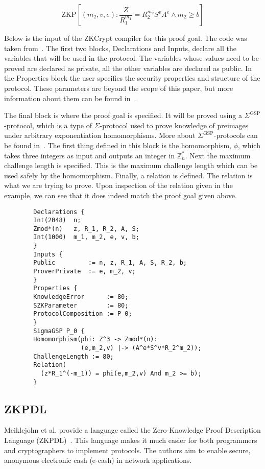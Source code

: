 \documentclass{sig-alternate}
\begin{document}
		\begin{equation*}
		\text{ZKP}[(m_{2}, v, e): \frac{Z}{R^{m_{1}}_{1}} = R^{m_{2}}_{2}S^{v}A^{e} \land m_{2} \ge b]
		\end{equation*}
		
		Below is the input of the ZKCrypt compiler for this proof goal. The code was taken
		from~\cite{ZKCrypt:2012}. The first two blocks, Declarations and Inputs, declare 
		all the variables that will be used in the protocol. The variables whose values
		need to be proved are declared as private, all the other variables are declared as
		public. In the Properties block the user specifies the security properties and
		structure of the protocol. These parameters are beyond the scope of this paper, but
		more information about them can be found in~\cite{ZKCrypt:2012}. 
		
		The final block is 	where the proof goal is specified. It will be proved using a
		$\Sigma^{\textrm{GSP}}$-protocol, which is a type of $\Sigma$-protocol used to prove
		knowledge of preimages under arbitrary exponentiation homomorphisms. More about 
		$\Sigma^{\textrm{GSP}}$-protocols can be found in~\cite{ZKCrypt:2012}.
		The first thing defined in this block is the homomorphism, $\phi$, which takes
		three integers as input and outputs an integer in $\mathbb{Z}^{*}_{n}$. Next the
		maximum challenge length is specified. This is the maximum challenge length which can
		be used safely by the homomorphism. Finally, a relation is defined. The relation
		is what we are trying to prove. Upon inspection of the relation given in the example,
		we can see that it does indeed match the proof goal given above.
				
		\begin{verbatim}
		Declarations {
		Int(2048)  n;
		Zmod*(n)   z, R_1, R_2, A, S;
		Int(1000)  m_1, m_2, e, v, b;
		}
		Inputs {
		Public         := n, z, R_1, A, S, R_2, b;
		ProverPrivate  := e, m_2, v;
		}
		Properties {
		KnowledgeError		:= 80;
		SZKParameter		:= 80;
		ProtocolComposition := P_0;
		}
		SigmaGSP P_0 {
		Homomorphism(phi: Z^3 -> Zmod*(n):
					 (e,m_2,v) |-> (A^e*S^v*R_2^m_2));
		ChallengeLength := 80;
		Relation(
		  (z*R_1^(-m_1)) = phi(e,m_2,v) And m_2 >= b);
		}
		\end{verbatim}
		
				
	\subsection{ZKPDL}
		Meiklejohn et al. provide a language called the Zero-Knowledge Proof Description
		Language (ZKPDL)~\cite{ZKPDL:2010}. This language makes it much easier for both
		programmers and 	cryptographers to implement protocols. The authors aim to enable
		secure, anonymous electronic cash (e-cash) in network applications.
		
\end{document}
